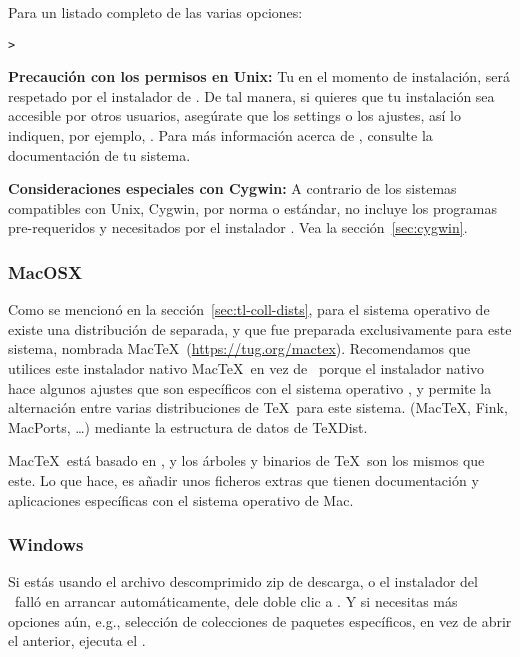 \documentclass{article}
\begin{document}
Para un listado completo de las varias opciones:
\begin{alltt}
> 
\end{alltt}

\textbf{Precaución con los permisos en Unix:} Tu  en el
momento de instalación, será respetado por el instalador de \TL{}. De
tal manera, si quieres que tu instalación sea accesible por otros
usuarios, asegúrate que los settings o los ajustes, así lo
indiquen, por ejemplo, . Para más
información acerca de 
, consulte la documentación de tu sistema. 

\textbf{Consideraciones especiales con Cygwin:} A contrario de los
sistemas compatibles con Unix, Cygwin, por norma o estándar, no
incluye los programas pre-requeridos y necesitados por el instalador
\TL{}. Vea la sección~\ref{sec:cygwin}.

\subsubsection{MacOSX}
\label{sec:macosx}

Como se mencionó en la sección~\ref{sec:tl-coll-dists}, para el
sistema operativo de \MacOSX existe una distribución de \TL{} separada, 
y que fue preparada exclusivamente para este sistema, nombrada
Mac\TeX\ (\url{https://tug.org/mactex}).  Recomendamos que utilices
este instalador nativo Mac\TeX\ en vez de \TL\, porque el instalador
nativo hace algunos ajustes que son específicos con el sistema
operativo \MacOSX, y permite la alternación entre varias
distribuciones de \TeX\ para este sistema. (Mac\TeX, Fink, MacPorts,
\ldots) mediante la estructura de datos de \TeX{}Dist.

Mac\TeX\ está basado en \TL, y los árboles y binarios de \TeX\ son los mismos que
este. Lo que hace, es añadir unos ficheros extras que tienen documentación y
aplicaciones específicas con el sistema operativo de Mac.

\subsubsection{Windows}\label{sec:wininst}

Si estás usando el archivo descomprimido zip de descarga, o el
instalador del \DVD\ falló en arrancar automáticamente, dele doble
clic a . Y si necesitas más opciones
aún, e.g., selección de colecciones de paquetes específicos, en vez de
abrir el anterior, ejecuta el . 
\end{document}
